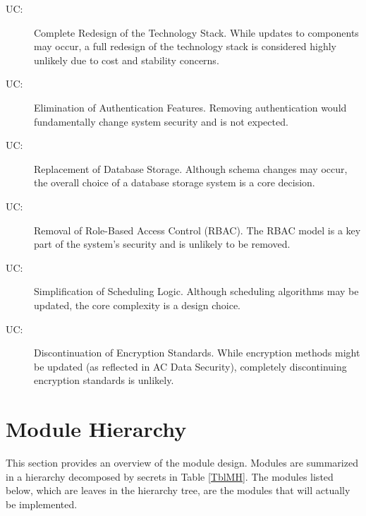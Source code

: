 \documentclass[12pt, titlepage]{article}
\newcounter{ucnum}
\newcommand{\uctheucnum}{UC\theucnum}
\begin{document}
\begin{description}
  \item[ \uctheucnum \label{ucTechStack}:] Complete Redesign of the Technology Stack.  
    While updates to components may occur, a full redesign of the technology stack is considered highly unlikely due to cost and stability concerns.
  \item[ \uctheucnum \label{ucAuthFeatures}:] Elimination of Authentication Features.  
    Removing authentication would fundamentally change system security and is not expected.
  \item[ \uctheucnum \label{ucDataStores}:] Replacement of Database Storage.  
    Although schema changes may occur, the overall choice of a database storage system is a core decision.
  \item[ \uctheucnum \label{ucRBAC}:] Removal of Role-Based Access Control (RBAC).  
    The RBAC model is a key part of the system’s security and is unlikely to be removed.
  \item[ \uctheucnum \label{ucSchedLogic}:] Simplification of Scheduling Logic.  
    Although scheduling algorithms may be updated, the core complexity is a design choice.
  \item[ \uctheucnum \label{ucEncryptStandard}:] Discontinuation of Encryption Standards.  
    While encryption methods might be updated (as reflected in AC Data Security), completely discontinuing encryption standards is unlikely.
  \end{description}

\section{Module Hierarchy} \label{SecMH}

This section provides an overview of the module design. Modules are summarized
in a hierarchy decomposed by secrets in Table \ref{TblMH}. The modules listed
below, which are leaves in the hierarchy tree, are the modules that will
actually be implemented.
\end{document}
